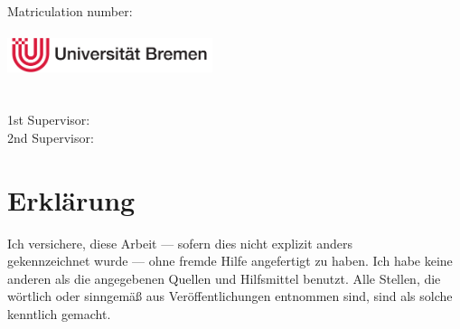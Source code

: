 \documentclass[twoside,openright,titlepage,numbers=noenddot,%
               headinclude,footinclude,cleardoublepage=empty,abstract=on,
               BCOR=5mm,paper=a4,listof=totocnumbered]{scrreprt}
\begin{document}
\title{\myTitle}
\subtitle{\mySubtitle}
\author{\myName}
\date{\myDate} 

\raggedbottom
{}
\captionsetup[subfigure]{justification=centering}

\pagestyle{plain}

\begin{titlepage}
    \begin{addmargin}[-1cm]{-3cm}
	\begin{center}
		\Huge
		\vspace*{1cm}
        \begingroup
            \myTitle \\ \bigskip
        \endgroup
		\LARGE
        \mySubtitle\\
		\vspace{3cm}
 		\Large
		\myName\\
		\vspace{6pt}
        Matriculation number: \myNumber\\
		\vspace{1cm}
		\myDate\\
		\vspace{2cm}
 		\includegraphics[width=6cm]{unibremen}\\
 		\vspace{1cm}
 		\large
 		\myDepartment\\
		\myDegree\\
		\vspace{4cm}
		\large
		1st Supervisor: \myProf\\
		2nd Supervisor: \myOtherProf\\
		\vspace{1.5cm}
	\end{center}
    \end{addmargin}
\end{titlepage}
\cleardoublepage{}

\chapter*{Erklärung}\label{erklaerung}
Ich versichere, diese Arbeit --- sofern dies nicht explizit anders \\gekennzeichnet wurde --- ohne fremde Hilfe angefertigt zu haben.
Ich habe keine anderen als die angegebenen Quellen und Hilfsmittel benutzt.
Alle Stellen, die wörtlich oder sinngemäß aus Veröffentlichungen entnommen sind, sind als solche kenntlich gemacht.
\end{document}
